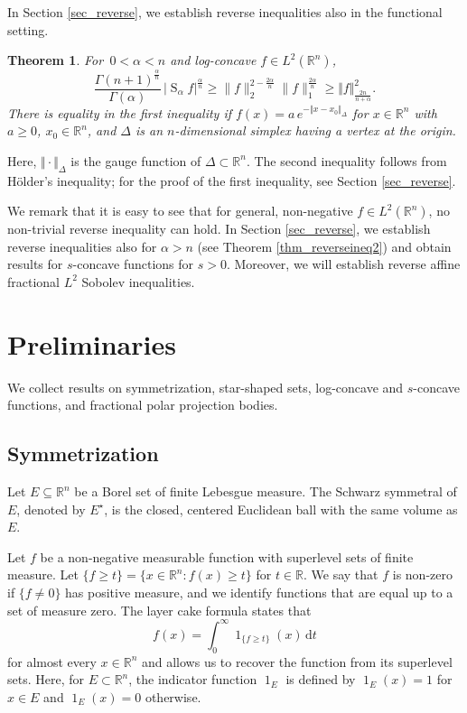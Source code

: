 \documentclass{amsart}
\newtheorem{theorem}{Theorem}
\newcommand{\R}{\mathbb R}
\renewcommand{\d}{\,\mathrm{d}}
\newcommand{\vol}[1]{\vert #1\vert}
\renewcommand{\chi}{\operatorname{1}}
\newcommand{\hls}[1]{\operatorname{S}_{#1}\!} %
\begin{document}
\goodbreak
In Section \ref{sec_reverse}, we establish reverse inequalities also in the functional setting.

\begin{theorem}\label{thm_reverseineq}
For $\,0<\alpha<n$ and  log-concave $f\in L^2(\R^n)$, 
\[ \frac{\Gamma(n+1)^\frac{\alpha}n}{\Gamma(\alpha)}\,\vol{\hls\alpha f}^\frac{\alpha}n \geq  \|f\|_2^{2-\frac{2\alpha}n} \|f\|_1^{\frac{2\alpha}n} \geq \Vert f\Vert_{\frac{2n}{n+\alpha}}^2.\]
There is equality in the first inequality if $f(x)=a\,e^{-\Vert x - x_0\Vert_\Delta}$ for $x\in\R^n$ with $a\ge 0$, $x_0\in\R^n$, and $\Delta$ is an $n$-dimensional simplex having a vertex at the origin. 
\end{theorem}

\noindent
Here, $\Vert\cdot\Vert_\Delta$ is the gauge function of $\Delta\subset \R^n$. The second inequality follows from H\"older's inequality; for the proof of the first inequality, see Section \ref{sec_reverse}.

\goodbreak
We remark that it is easy to see that for general, non-negative $f\in L^2(\R^n)$, no non-trivial reverse inequality can hold.  In Section \ref{sec_reverse}, we establish reverse inequalities also for $\alpha>n$ (see Theorem \ref{thm_reverseineq2}) and obtain results for $s$-concave functions for $s>0$. Moreover, we will establish reverse affine fractional $L^2$  Sobolev inequalities.







\section{Preliminaries}\label{sec_prelim}

We collect results on symmetrization, star-shaped sets, log-concave and $s$-concave functions, and fractional polar projection bodies. 

\subsection{Symmetrization} 

Let $E \subseteq \R^n$ be a Borel set of finite Lebesgue measure.
The Schwarz symmetral of $E$, denoted by $E^\star$, is the closed, centered Euclidean ball with the same volume as $E$.

Let $f$ be a non-negative measurable function with superlevel sets of finite measure. Let $\{f\ge t\}=\{ x\in \R^n: f(x)\ge t\}$ for $t\in\R$.  We say that $f$ is non-zero if $\{f\ne 0\}$ has positive measure, and we identify functions that are equal up to a set of measure zero.
The layer cake formula states that
\begin{equation}\label{eq_layer_cake}
f(x) = \int_0^\infty \chi_{\{f\geq t\}}(x) \d t
\end{equation}
for almost every $x \in \R^n$ and allows us to recover the function from its superlevel sets. Here, for $E\subset \R^n$, the indicator function $\chi_E$ is defined by $\chi_E(x)=1$ for $x\in E$ and $\chi_E(x)=0$ otherwise.
\end{document}
